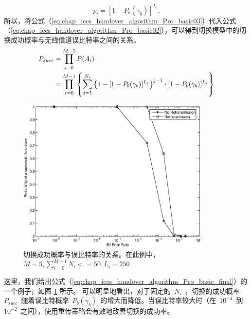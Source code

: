 \begin{equation}\label{eq:chap_iccs_handover_algorithm_Pro_basic03}
p_{i}=[1-P_{b}(\gamma_{b})]^{L_{i}}.
\end{equation}
所以，将公式（\ref{eq:chap_iccs_handover_algorithm_Pro_basic03}）代入公式（\ref{eq:chap_iccs_handover_algorithm_Pro_basic02}），可以得到切换模型中的切换成功概率与无线信道误比特率之间的关系。
\begin{align}
\label{eq:chap_iccs_handover_algorithm_Pro_basic_final}
\notag P_{succ}&=\prod_{i=0}^{M-1}P(A_{i})\\
&=\prod_{i=0}^{M-1}\left\{ \sum_{j=1}^{N_{i}}\left\{ 1-[1-P_{b}(\gamma_{b})]^{L_{i}}\right\} ^{j-1} \cdot[1-P_{b}(\gamma_{b})]^{L_{i}}\right\}
\end{align}
\begin{figure}[t]
\begin{centering}
\includegraphics[height=7.75cm]{iccs_ber_prob}
\par\end{centering}
\caption{切换成功概率与误比特率的关系。在此例中，~$M=5,\sum_{i=0}^{M-1}N_i<=50,L_i=250$~}
\label{fig:chap_iccs_handover_algorithm_PBER}
\end{figure}
这里，我们给出公式（\ref{eq:chap_iccs_handover_algorithm_Pro_basic_final}）的一个例子，如图 \ref{fig:chap_iccs_handover_algorithm_PBER} 所示。
可以明显地看出，对于固定的~$N_i$~，切换的成功概率~$P_{succ}$~随着误比特概率~$P_b(\gamma_b)$~的增大而降低。当误比特率较大时（在~$10^{-4}$~到~$10^{-2}$~之间），使用重传策略会有效地改善切换的成功率。

